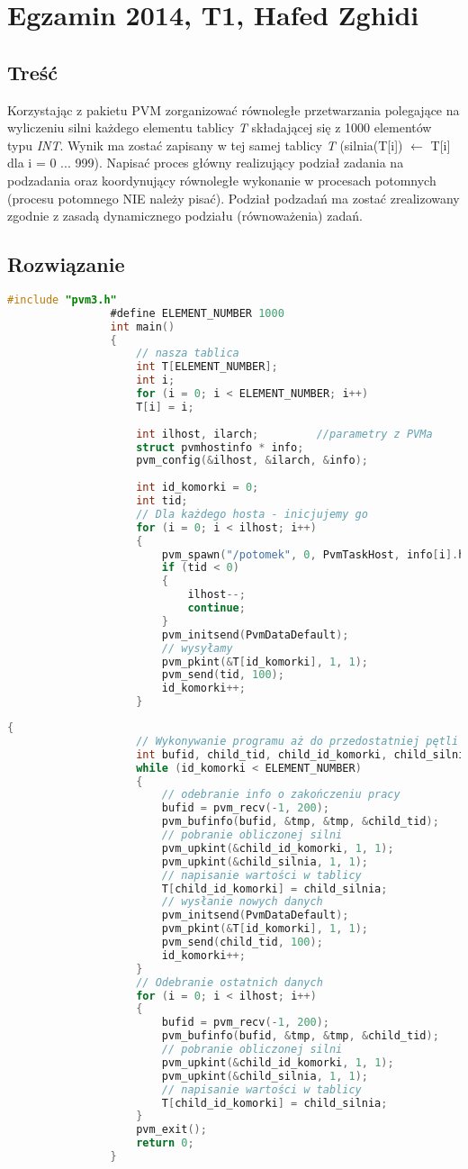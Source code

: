 		\section{Egzamin 2014, T1, Hafed Zghidi}
		\subsection{Treść}
			Korzystając z pakietu PVM zorganizować równoległe przetwarzania polegające na wyliczeniu silni każdego elementu tablicy \textit{T} składającej się z 1000 elementów typu \textit{INT}. Wynik ma zostać zapisany w tej samej tablicy \textit{T} (silnia(T[i]) $ \leftarrow $ T[i] dla i = 0 ... 999). Napisać proces główny realizujący podział zadania na podzadania oraz koordynujący równoległe wykonanie w procesach potomnych (procesu potomnego NIE należy pisać). Podział podzadań ma zostać zrealizowany zgodnie z zasadą dynamicznego podziału (równoważenia) zadań.
		\subsection{Rozwiązanie}
			\begin{lstlisting}[language=C]
				#include "pvm3.h"
				#define ELEMENT_NUMBER 1000
				int main()
				{
					// nasza tablica
					int T[ELEMENT_NUMBER];
					int i;
					for (i = 0; i < ELEMENT_NUMBER; i++)
					T[i] = i;
					
					int ilhost, ilarch;			//parametry z PVMa
					struct pvmhostinfo * info;
					pvm_config(&ilhost, &ilarch, &info);
					
					int id_komorki = 0;
					int tid;
					// Dla każdego hosta - inicjujemy go
					for (i = 0; i < ilhost; i++)
					{
						pvm_spawn("/potomek", 0, PvmTaskHost, info[i].hi_name, 1, &tid);	//powołanie potomka
						if (tid < 0)
						{
							ilhost--;
							continue;
						}
						pvm_initsend(PvmDataDefault);
						// wysyłamy
						pvm_pkint(&T[id_komorki], 1, 1);
						pvm_send(tid, 100);
						id_komorki++;
					}
			\end{lstlisting}
			\newpage
			\begin{lstlisting}[language=C]
				{
					// Wykonywanie programu aż do przedostatniej pętli
					int bufid, child_tid, child_id_komorki, child_silnia, tmp;
					while (id_komorki < ELEMENT_NUMBER)
					{
						// odebranie info o zakończeniu pracy
						bufid = pvm_recv(-1, 200);
						pvm_bufinfo(bufid, &tmp, &tmp, &child_tid);
						// pobranie obliczonej silni
						pvm_upkint(&child_id_komorki, 1, 1);
						pvm_upkint(&child_silnia, 1, 1);
						// napisanie wartości w tablicy
						T[child_id_komorki] = child_silnia;
						// wysłanie nowych danych
						pvm_initsend(PvmDataDefault);
						pvm_pkint(&T[id_komorki], 1, 1);
						pvm_send(child_tid, 100);
						id_komorki++;
					}
					// Odebranie ostatnich danych
					for (i = 0; i < ilhost; i++)
					{
						bufid = pvm_recv(-1, 200);
						pvm_bufinfo(bufid, &tmp, &tmp, &child_tid);
						// pobranie obliczonej silni
						pvm_upkint(&child_id_komorki, 1, 1);
						pvm_upkint(&child_silnia, 1, 1);
						// napisanie wartości w tablicy
						T[child_id_komorki] = child_silnia;
					}
					pvm_exit();
					return 0;
				}
			\end{lstlisting}
		\newpage
